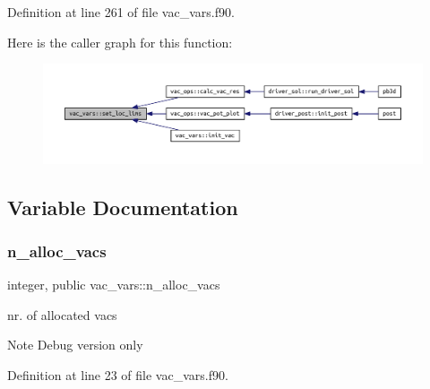 Definition at line 261 of file vac\+\_\+vars.\+f90.

Here is the caller graph for this function\+:\nopagebreak
\begin{figure}[H]
\begin{center}
\leavevmode
\includegraphics[width=350pt]{namespacevac__vars_a5bfa31e3a61464281d70a4e1a8246510_icgraph}
\end{center}
\end{figure}


\subsection{Variable Documentation}
\mbox{\label{namespacevac__vars_a48e085d21d3006e777a7052577e89a21}} 
\subsubsection{\texorpdfstring{n\+\_\+alloc\+\_\+vacs}{n\_alloc\_vacs}}
{\footnotesize\ttfamily integer, public vac\+\_\+vars\+::n\+\_\+alloc\+\_\+vacs}



nr. of allocated vacs 

\begin{DoxyNote}{Note}
Debug version only 
\end{DoxyNote}


Definition at line 23 of file vac\+\_\+vars.\+f90.


